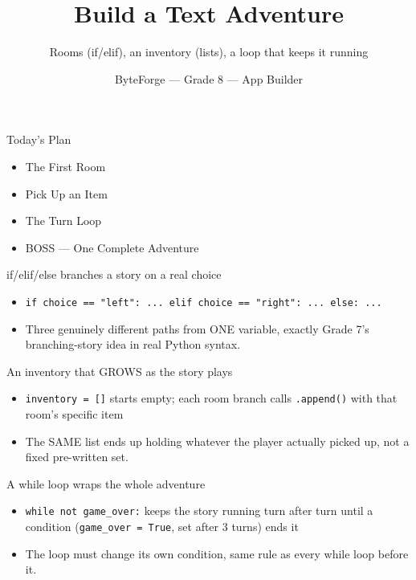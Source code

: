 \documentclass[aspectratio=169]{beamer}
\title{Build a Text Adventure}
\subtitle{Rooms (if/elif), an inventory (lists), a loop that keeps it running}
\author{ByteForge --- Grade 8 --- App Builder}
\date{}
\begin{document}
\begin{frame}
    \titlepage
\end{frame}

\begin{frame}{Today's Plan}
    \begin{itemize}
        \item The First Room
        \item Pick Up an Item
        \item The Turn Loop
        \item[$\bigstar$] BOSS --- One Complete Adventure
    \end{itemize}
\end{frame}

\begin{frame}{if/elif/else branches a story on a real choice}
    \large
    \begin{itemize}
        \item \texttt{if choice == "left": ... elif choice == "right": ... else: ...}
        \item Three genuinely different paths from ONE variable, exactly Grade 7's branching-story idea in real Python syntax.
    \end{itemize}
\end{frame}


\begin{frame}{An inventory that GROWS as the story plays}
    \large
    \begin{itemize}
        \item \texttt{inventory = []} starts empty; each room branch calls \texttt{.append()} with that room's specific item
        \item The SAME list ends up holding whatever the player actually picked up, not a fixed pre-written set.
    \end{itemize}
\end{frame}


\begin{frame}{A while loop wraps the whole adventure}
    \large
    \begin{itemize}
        \item \texttt{while not game\_over:} keeps the story running turn after turn until a condition (\texttt{game\_over = True}, set after 3 turns) ends it
        \item The loop must change its own condition, same rule as every while loop before it.
    \end{itemize}
\end{frame}
\end{document}
